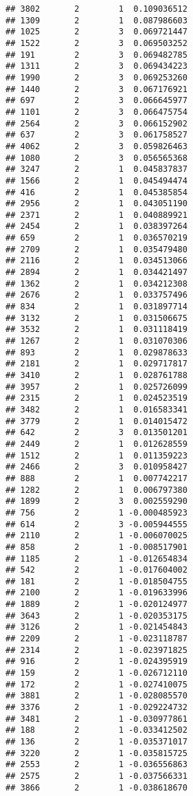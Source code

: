 \documentclass[
]{article}
\begin{document}
\begin{verbatim}
## 3802       2        1  0.109036512
## 1309       2        1  0.087986603
## 1025       2        3  0.069721447
## 1522       2        3  0.069503252
## 191        2        3  0.069482785
## 1311       2        3  0.069434223
## 1990       2        3  0.069253260
## 1440       2        3  0.067176921
## 697        2        3  0.066645977
## 1101       2        3  0.066475754
## 2564       2        3  0.066152902
## 637        2        3  0.061758527
## 4062       2        3  0.059826463
## 1080       2        3  0.056565368
## 3247       2        1  0.045837837
## 1566       2        1  0.045494474
## 416        2        1  0.045385854
## 2956       2        1  0.043051190
## 2371       2        1  0.040889921
## 2454       2        1  0.038397264
## 659        2        1  0.036570219
## 2709       2        1  0.035479480
## 2116       2        1  0.034513066
## 2894       2        1  0.034421497
## 1362       2        1  0.034212308
## 2676       2        1  0.033757496
## 834        2        1  0.031897714
## 3132       2        1  0.031506675
## 3532       2        1  0.031118419
## 1267       2        1  0.031070306
## 893        2        1  0.029878633
## 2181       2        1  0.029717817
## 3410       2        1  0.028761788
## 3957       2        1  0.025726099
## 2315       2        1  0.024523519
## 3482       2        1  0.016583341
## 3779       2        1  0.014015472
## 642        2        3  0.013501201
## 2449       2        1  0.012628559
## 1512       2        1  0.011359223
## 2466       2        3  0.010958427
## 888        2        1  0.007742217
## 1282       2        1  0.006797380
## 1899       2        3  0.002559290
## 756        2        1 -0.000485923
## 614        2        3 -0.005944555
## 2110       2        1 -0.006070025
## 858        2        1 -0.008517901
## 1185       2        1 -0.012654834
## 542        2        1 -0.017604002
## 181        2        1 -0.018504755
## 2100       2        1 -0.019633996
## 1889       2        1 -0.020124977
## 3643       2        1 -0.020353175
## 3126       2        1 -0.021454843
## 2209       2        1 -0.023118787
## 2314       2        1 -0.023971825
## 916        2        1 -0.024395919
## 159        2        1 -0.026712110
## 172        2        1 -0.027410075
## 3881       2        1 -0.028085570
## 3376       2        1 -0.029224732
## 3481       2        1 -0.030977861
## 188        2        1 -0.033412502
## 136        2        1 -0.035371017
## 3220       2        1 -0.035815725
## 2553       2        1 -0.036556863
## 2575       2        1 -0.037566331
## 3866       2        1 -0.038618670

\end{verbatim}
\end{document}
